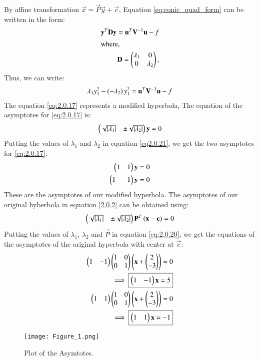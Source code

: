\documentclass[journal,12pt,twocolumn]{IEEEtran}
\begin{document}
By affine transformation $\vec{x} = \vec{P}\vec{y}+\vec{c} $,  Equation \eqref{eq:conic_quad_form} can be written in the form:
\begin{align} 
\vec{y}^T\vec{D}\vec{y} =  \vec{u}^T\vec{V}^{-1}\vec{u} -f \\
\intertext{where,}
\vec{D} = \myvec{\lambda_1 & 0\\ 0 & \lambda_2},
\label{eq:quad_form_hyper}
\end{align}
Thus, we can write:
\begin{align}
    \lambda_1y_1^2 -\brak{-\lambda_2}y_1^2 = \vec{u}^T\vec{V}^{-1}\vec{u} -f \label{eq:2.0.17}
\end{align}
The equation \eqref{eq:2.0.17} represents a modified hyperbola, The equation of the asymptotes for \eqref{eq:2.0.17} is:
\begin{align} 
\myvec{\sqrt{\abs{\lambda_1}} & \pm \sqrt{\abs{\lambda_2}}}\vec{y} = 0 \label{eq2.0.21}
\end{align} 
Putting the values of $\lambda_1$ and $\lambda_2$ in equation \eqref{eq2.0.21}, we get the two asymptotes for \eqref{eq:2.0.17}:
\begin{align} 
\begin{pmatrix}1 & 1\end{pmatrix}\mathbf{y} = 0 \\
\begin{pmatrix}1 & -1\end{pmatrix}\mathbf{y} = 0
\end{align} 
These are the asymptotes of our modified hyperbola. The asymptotes of our original hyberbola in equation \eqref{2.0.2} can be obtained using:
\begin{align} 
\label{eq:quad_form_pair}
\myvec{\sqrt{\abs{\lambda_1}} & \pm \sqrt{\abs{\lambda_2}}}\vec{P}^T\brak{\vec{x}-\vec{c}} = 0
\label{eq:2.0.20}
\end{align} 
Putting the values of $\lambda_1$, $\lambda_2$ and $\vec{P}$  in equation \eqref{eq:2.0.20}, we get the equations of the asymptotes of the original hyperbola with center at $\Vec{c}$:
\begin{align} 
    \myvec{1 &-1}\myvec{1&0 \\0& 1}\brak{\vec{x}+\myvec{2 \\-3}}=0\\
    \implies \boxed{\myvec{1 &-1}\Vec{x}=5} \label{2.0.26}\\
    \myvec{1 & 1}\myvec{1&0 \\0& 1}\brak{\vec{x}+\myvec{2 \\-3}}=0\\
     \implies \boxed{\myvec{1 &1}\Vec{x}=-1} \label{2.0.28}
\end{align}

\begin{figure}[h!]
    \centering
    \texttt{[image: Figure\_1.png]}
    \caption{Plot of the Asymtotes.}
    \label{Plot of the Asymtotes}
\end{figure}
\end{document}
